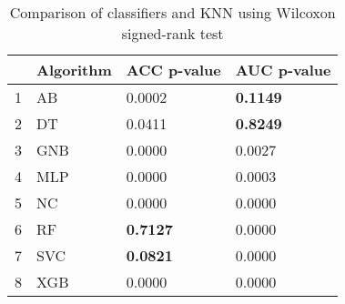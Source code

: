 \begin{table}
\footnotesize
\caption{Comparison of classifiers and KNN using Wilcoxon signed-rank test}
\label{tab:wilcoxon comparison}
\begin{tabular}{llll}
\hline
 & Algorithm & ACC p-value & AUC p-value \\
\hline
1 & AB & 0.0002 & \textbf{0.1149} \\
2 & DT & 0.0411 & \textbf{0.8249} \\
3 & GNB & 0.0000 & 0.0027 \\
4 & MLP & 0.0000 & 0.0003 \\
5 & NC & 0.0000 & 0.0000 \\
6 & RF & \textbf{0.7127} & 0.0000 \\
7 & SVC & \textbf{0.0821} & 0.0000 \\
8 & XGB & 0.0000 & 0.0000 \\
\hline
\end{tabular}
\end{table}
